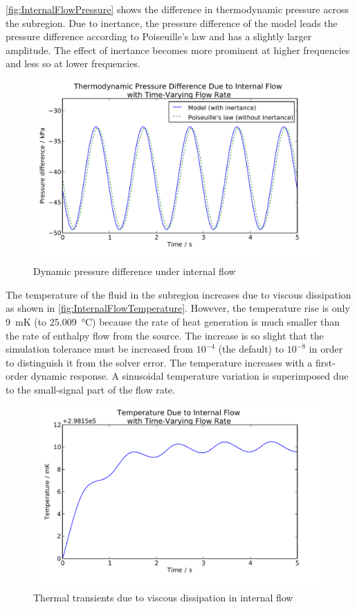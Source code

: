 \autoref{fig:InternalFlowPressure} shows the difference in thermodynamic pressure across the subregion.  Due to inertance, the pressure difference of the model leads the pressure difference according to Poiseuille's law and has a slightly larger amplitude.  The effect of inertance becomes more prominent at higher frequencies and less so at lower frequencies.

\begin{figure}[htbp]
  \includegraphics[width=\linewidth]{Results/Basic/InternalFlow/1/Pressure}%
  \caption{Dynamic pressure difference under internal flow}%
  \label{fig:InternalFlowPressure}
\end{figure}

The temperature of the fluid in the subregion increases due to viscous dissipation as shown in \autoref{fig:InternalFlowTemperature}.  However, the temperature rise is only \SI{9}{mK} (to \SI{25.009}{\celsius}) because the rate of heat generation is much smaller than the rate of enthalpy flow from the source.  The increase is so slight that the simulation tolerance must be increased from $10^{-4}$ (the default) to $10^{-8}$ in order to distinguish it from the solver error.  The temperature increases with a first-order dynamic response.  A sinusoidal temperature variation is superimposed due to the small-signal part of the flow rate.  

\begin{figure}[htbp]
  \includegraphics[width=\linewidth]{Results/Basic/InternalFlow/1/Temperature}%
  \caption{Thermal transients due to viscous dissipation in internal flow}%
  \label{fig:InternalFlowTemperature}
\end{figure}


